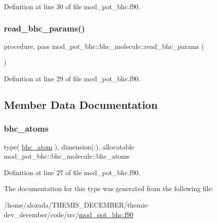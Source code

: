 Definition at line 30 of file mod\+\_\+pot\+\_\+bhc.\+f90.

\mbox{\label{structmod__pot__bhc_1_1bhc__molecule_a8c2379aa725c1adb422093d53bec6dcf}} 
\subsubsection{\texorpdfstring{read\+\_\+bhc\+\_\+params()}{read\_bhc\_params()}}
{\footnotesize\ttfamily procedure, pass mod\+\_\+pot\+\_\+bhc\+::bhc\+\_\+molecule\+::read\+\_\+bhc\+\_\+params (\begin{DoxyParamCaption}{ }\end{DoxyParamCaption})}



Definition at line 29 of file mod\+\_\+pot\+\_\+bhc.\+f90.



\subsection{Member Data Documentation}
\mbox{\label{structmod__pot__bhc_1_1bhc__molecule_a87e3db2ee7f569380cccb2b3ad0bbf15}} 
\subsubsection{\texorpdfstring{bhc\+\_\+atoms}{bhc\_atoms}}
{\footnotesize\ttfamily type( \hyperlink{structmod__pot__bhc_1_1bhc__atom}{bhc\+\_\+atom} ), dimension(\+:), allocatable mod\+\_\+pot\+\_\+bhc\+::bhc\+\_\+molecule\+::bhc\+\_\+atoms}



Definition at line 27 of file mod\+\_\+pot\+\_\+bhc.\+f90.



The documentation for this type was generated from the following file\+:\begin{DoxyCompactItemize}
\item 
/home/alozada/\+T\+H\+E\+M\+I\+S\+\_\+\+D\+E\+C\+E\+M\+B\+E\+R/themis-\/dev\+\_\+december/code/src/\hyperlink{mod__pot__bhc_8f90}{mod\+\_\+pot\+\_\+bhc.\+f90}\end{DoxyCompactItemize}
